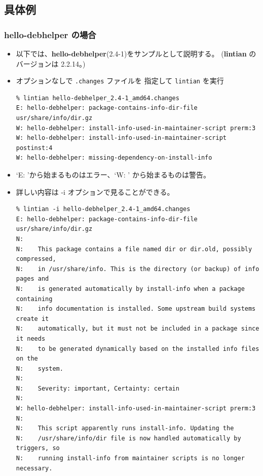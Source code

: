 \documentclass[mingoth,a4paper]{jsarticle}
\begin{document}
\subsection{具体例}


\subsubsection{hello-debhelper の場合}

\begin{itemize}
\item 以下では、\textbf{hello-debhelper}(2.4-1)をサンプルとして説明する。
  (\textbf{lintian} のバージョンは 2.2.14。)
\item オプションなしで \texttt{.changes} ファイルを
  指定して \texttt{lintian} を実行
  \begin{screen}[5]
    {\footnotesize{}
\begin{verbatim}
% lintian hello-debhelper_2.4-1_amd64.changes
E: hello-debhelper: package-contains-info-dir-file usr/share/info/dir.gz
W: hello-debhelper: install-info-used-in-maintainer-script prerm:3
W: hello-debhelper: install-info-used-in-maintainer-script postinst:4
W: hello-debhelper: missing-dependency-on-install-info
\end{verbatim}
    }
  \end{screen}
\item `E: 'から始まるものはエラー、`W: ' から始まるものは警告。
\item 詳しい内容は -i オプションで見ることができる。
  \begin{screen}[5]
    {\footnotesize{}
\begin{verbatim}
% lintian -i hello-debhelper_2.4-1_amd64.changes
E: hello-debhelper: package-contains-info-dir-file usr/share/info/dir.gz
N: 
N:    This package contains a file named dir or dir.old, possibly compressed,
N:    in /usr/share/info. This is the directory (or backup) of info pages and
N:    is generated automatically by install-info when a package containing
N:    info documentation is installed. Some upstream build systems create it
N:    automatically, but it must not be included in a package since it needs
N:    to be generated dynamically based on the installed info files on the
N:    system.
N:    
N:    Severity: important, Certainty: certain
N: 
W: hello-debhelper: install-info-used-in-maintainer-script prerm:3
N: 
N:    This script apparently runs install-info. Updating the
N:    /usr/share/info/dir file is now handled automatically by triggers, so
N:    running install-info from maintainer scripts is no longer necessary.

\end{verbatim}}
\end{screen}
\end{itemize}
\end{document}
